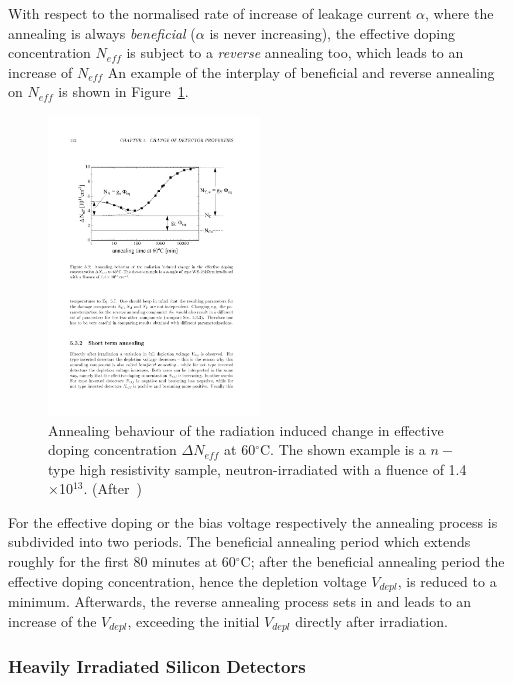 With respect to the normalised rate of increase of leakage current $\alpha$, where the annealing 
is always {\it beneficial} ($\alpha$ is never increasing), the effective doping concentration $N_{eff}$
is subject to a {\it reverse} annealing too, which leads to an increase of $N_{eff}$
An example of the interplay of beneficial and reverse annealing on $N_{eff}$ is shown in 
Figure~\ref{fig:Neff_annealing}.

\begin{figure}
\centering
\includegraphics[width=0.5\textwidth]{Neff_annealing.pdf}
\caption{\label{fig:Neff_annealing}Annealing behaviour of the radiation induced change in effective 
doping concentration $\Delta N_{eff}$ at 60$^{\circ}$C. The shown example is a $n-$type high 
resistivity sample, neutron-irradiated with a fluence of 1.4$\times$10$^{13}$. 
(After~\cite{moll-thesis})}
\end{figure}


For the effective doping or the bias voltage respectively the annealing process is subdivided into 
two periods. 
The beneficial annealing period which extends roughly for the first 80 minutes at 60$^{\circ}$C; 
after the beneficial annealing period the effective doping concentration, hence the depletion voltage 
$V_{depl}$, is  reduced to a minimum. Afterwards, the reverse annealing process sets in and leads 
to an increase 
of the $V_{depl}$, exceeding the initial $V_{depl}$ directly after 
irradiation.

\subsubsection{Heavily Irradiated Silicon Detectors}

